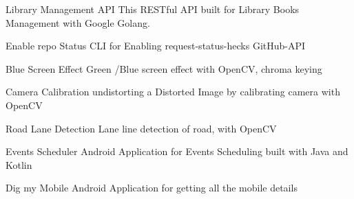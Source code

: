 

\begin{cvskills}

  \cvskill
    {Library Management API} %
    {This RESTful API built for Library Books Management with Google Golang.} %

  \cvskill
    {Enable repo Status} %
    {CLI for Enabling request-status-hecks GitHub-API} %

  \cvskill
    {Blue Screen Effect} %
    {Green /Blue screen effect with OpenCV, chroma keying} %

  \cvskill
    {Camera Calibration} %
    {undistorting a Distorted Image by calibrating camera with OpenCV } %
    
  \cvskill
    {Road Lane Detection} %
    {Lane line detection of road, with OpenCV} %
    
    
  \cvskill
    {Events Scheduler} %
    {Android Application for Events Scheduling built with Java and Kotlin} %
    
    
  \cvskill
    {Dig my Mobile} %
    {Android Application for getting all the mobile details} %
\end{cvskills}



